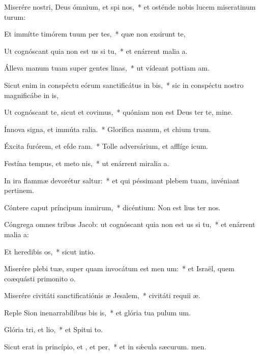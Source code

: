 \item Miserére nostri, Deus ómnium, et spi nos,~* et osténde nobis lucem miseratinum turum:
\item Et immítte timórem tuum per tes,~* quæ non exsirunt te,
\item Ut cognóscant quia non est us si tu,~* et enárrent malia a.
\item Álleva manum tuam super gentes linas,~* ut vídeant pottiam am.
\item Sicut enim in conspéctu eórum sanctificátus  in bis,~* sic in conspéctu nostro magnificábe in is,
\item Ut cognóscant te, sicut et  covimus,~* quóniam non est Deus ter te, mine.
\item Ínnova signa, et immúta ralia.~* Glorífica manum, et chium trum.
\item Éxcita furórem, et efde ram.~* Tolle adversárium, et afflíge icum.
\item Festína tempus, et meto nis,~* ut enárrent miralia a.
\item In ira flammæ devorétur  saltur:~* et qui péssimant plebem tuam, invéniant pertinem.
\item Cóntere caput príncipum inmirum,~* dicéntium: Non est lius ter nos.
\item Cóngrega omnes tribus Jacob: ut cognóscant quia non est us si tu,~* et enárrent malia a:
\item Et heredibis os,~* sicut  intio.
\item Miserére plebi tuæ, super quam invocátum est men um:~* et Israël, quem coæquásti primonito o.
\item Miserére civitáti sanctificatiónis æ Jesalem,~* civitáti requii æ.
\item Reple Sion inenarrabílibus bis is,~* et glória tua pulum um.
\item Glória tri, et lio,~* et Spitui to.
\item Sicut erat in princípio, et , et per,~* et in sǽcula sæcurum. men.
